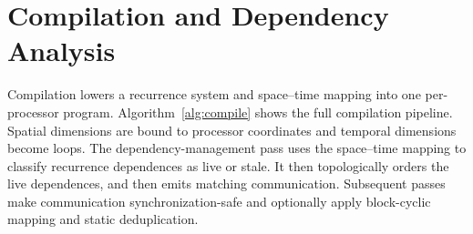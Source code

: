 \documentclass[sigplan, nonacm]{acmart}
\begin{document}

\section{Compilation and Dependency Analysis}
\label{sec:compilation}
Compilation lowers a recurrence system and space--time mapping into one per-processor program. Algorithm~\ref{alg:compile} shows the full compilation pipeline. Spatial dimensions are bound to processor coordinates and temporal dimensions become loops. The dependency-management pass uses the space--time mapping to classify recurrence dependences as live or stale. It then topologically orders the live dependences, and then emits matching communication. Subsequent passes make communication synchronization-safe and optionally apply block-cyclic mapping and static deduplication. 
\end{document}
